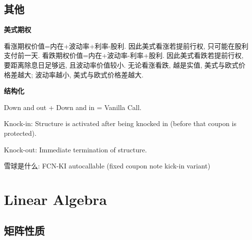 \documentclass[UTF8]{ctexart}
\begin{document}
\subsection{其他}
\noindent \textbf{美式期权} \par
看涨期权价值=内在+波动率+利率-股利. 因此美式看涨若提前行权, 只可能在股利支付前一天.
看跌期权价值=内在+波动率-利率+股利. 因此美式看跌若提前行权, 要距离除息日足够远, 且波动率价值较小.
无论看涨看跌, 越是实值, 美式与欧式价格差越大; 波动率越小, 美式与欧式价格差越大.


\noindent \textbf{结构化} \par
Down and out + Down and in = Vanilla Call.

Knock-in: Structure is activated after being knocked in (before that coupon is protected).

Knock-out: Immediate termination of structure.

雪球是什么: FCN-KI autocallable (fixed coupon note kick-in variant)


\section{Linear Algebra}

\subsection{矩阵性质}
\end{document}
